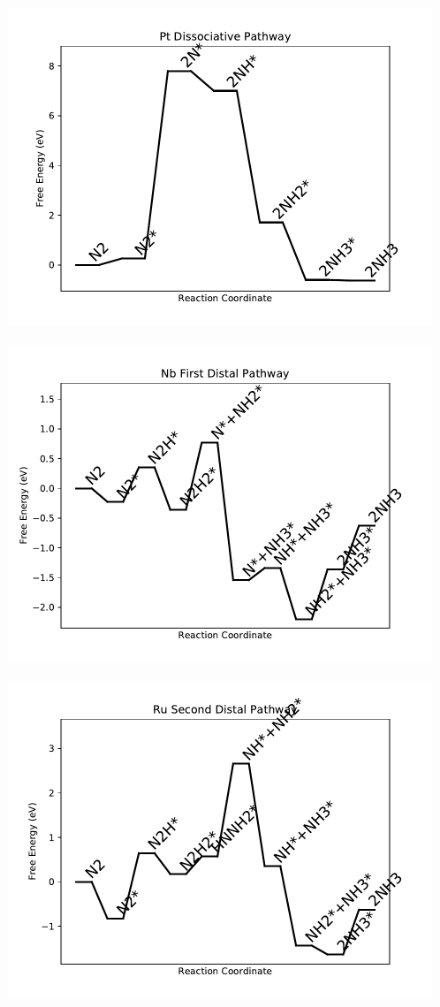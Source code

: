 \begin{figure}
\includegraphics[width=0.8\linewidth]{data/plots/Pt_dissociative.pdf}
\end{figure}

\begin{figure}
\includegraphics[width=0.8\linewidth]{data/plots/Nb_distal_1.pdf}
\end{figure}

\begin{figure}
\includegraphics[width=0.8\linewidth]{data/plots/Ru_distal_2.pdf}
\end{figure}

